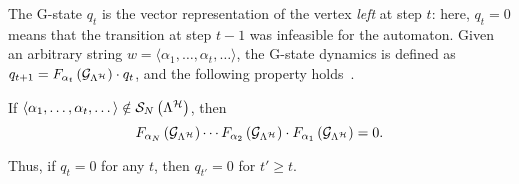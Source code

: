%
The G-state $q_t$ is the vector representation of the vertex \emph{left} at step $t$: here, $q_t=0$ means that the transition at step $t-1$ was infeasible for the automaton. 
Given an arbitrary string $w=\langle \alpha_1,\dots,\alpha_t,\dots \rangle$, the G-state dynamics is defined as $q_{t+1} = F_{\alpha_t}\left( \mathcal{G}_{\Lambda^{\mathcal{H}}} \right) \cdot q_t$, and the following property holds~\cite{xu2012matrix}.
%
\begin{lemma}%
    \label{cor:Fseqnotinlambda}%
    If $\langle \alpha_1,\dots,\alpha_t,\dots \rangle \notin \mathcal{S}_{N}\left(  \Lambda^{\mathcal{H}}  \right)$, then 
    \begin{equation*}
        F_{\alpha_N}\left( \mathcal{G}_{\Lambda^{\mathcal{H}}} \right) \cdots F_{\alpha_2}\left( \mathcal{G}_{\Lambda^{\mathcal{H}}} \right) \cdot F_{\alpha_1}\left( \mathcal{G}_{\Lambda^{\mathcal{H}}} \right) = 0.
    \end{equation*}
\end{lemma}
Thus, if $q_t=0$ for any $t$, then $q_{t'}=0$ for $t' \geq t$.

